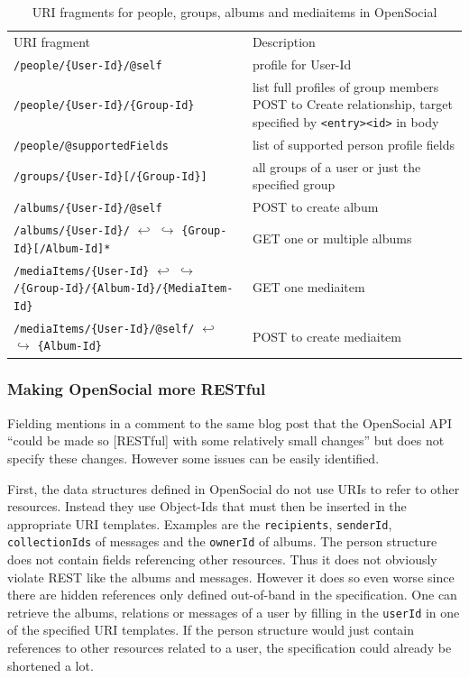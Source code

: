 \documentclass[11pt,a4paper,headsepline,twoside]{scrartcl}		%
\begin{document}
\begin{table}[tbh]
\begin{tabular}{p{7cm} p{12cm}}
  URI fragment & Description \\
  \verb:/people/{User-Id}/@self: & profile for User-Id \\
  \verb:/people/{User-Id}/{Group-Id}: & list full profiles of group members \newline
                              POST to Create relationship, target \newline
                              specified by \verb:<entry><id>: in body \\
  \verb:/people/@supportedFields: & list of supported person profile fields \\
  \verb:/groups/{User-Id}[/{Group-Id}]: & all groups of a user or just the specified group \\
  \verb:/albums/{User-Id}/@self: & POST to create album \\
  \verb:/albums/{User-Id}/: $\hookleftarrow$ \newline $\hookrightarrow$
  \verb:{Group-Id}[/Album-Id]*: & GET one or multiple albums \\
  \verb:/mediaItems/{User-Id}: $\hookleftarrow$ \newline $\hookrightarrow$ 
  \verb:/{Group-Id}/{Album-Id}/{MediaItem-Id}: & GET one mediaitem \\
  \verb:/mediaItems/{User-Id}/@self/: $\hookleftarrow$ \newline $\hookrightarrow$
  \verb:{Album-Id}:  & POST to create mediaitem \\
\end{tabular}
  \caption{URI fragments for people, groups, albums and mediaitems in OpenSocial}
  \label{tab:OSURIs}
\end{table}

\subsubsection{Making OpenSocial more RESTful}
\label{sec:poss-impr}

Fielding mentions in a comment to the same blog post \cite{Fielding2008} that the
OpenSocial API ``could be made so [RESTful] with some relatively small changes''
but does not specify these changes. However some issues can be easily
identified.

First, the data structures defined in OpenSocial do not use URIs to refer to
other resources. Instead they use Object-Ids that must then be inserted in the
appropriate URI templates. Examples are the \texttt{recipients},
\texttt{senderId}, \texttt{collectionIds} of messages and the \texttt{ownerId}
of albums. The person structure does not contain fields referencing other
resources. Thus it does not obviously violate REST like the albums and
messages. However it does so even worse since there are hidden references only
defined out-of-band in the specification. One can retrieve the albums, relations
or messages of a user by filling in the \texttt{userId} in one of the specified
URI templates. If the person structure would just contain references to other
resources related to a user, the specification could already be shortened a lot.
\end{document}
